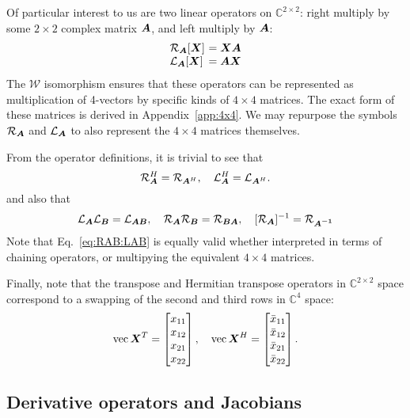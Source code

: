 \documentclass[useAMS,usenatbib]{mn2e}
\makeatletter
\newcommand{\COMPLEX}{\mathbb{C}}
\newcommand{\mat}[1]{{\bmath{#1}}}
\newcommand{\Matrix}[2]{\left [ \begin{array}{@{}#1@{}}#2\end{array} \right ]}
\newcommand{\Rop}[1]{\mathcal{R}_{{#1}}}
\newcommand{\Lop}[1]{\mathcal{L}_{{#1}}}
\numberwithin{equation}{section}
\makeatother
\begin{document}
Of particular interest to us are two linear operators on $\COMPLEX^{2\times2}$: right multiply by some $2\times2$ complex matrix $\mat{A}$, and left multiply by $\mat{A}$:
\begin{equation}
\begin{array}{l@{~}l}
\Rop{\mat{A}}[\mat{X}] &= \mat{XA} \\
\Lop{\mat{A}}[\mat{X}] &= \mat{AX} \\
\end{array}
\end{equation}
The $\mathcal{W}$ isomorphism ensures that these operators can be represented as multiplication of 4-vectors 
by specific kinds of $4\times4$ matrices. The exact form of these matrices is derived in Appendix~\ref{app:4x4}.
We may repurpose the symbols $\Rop{\mat{A}}$ and $\Lop{\mat{A}}$ to also represent the $4\times4$ matrices themselves. 

From the operator definitions, it is trivial to see that
\begin{equation}
\label{eq:RH:LH}
\Rop{\mat{A}}^H = \Rop{\mat{A}^H},~~~\Lop{\mat{A}}^H = \Lop{\mat{A}^H}.
\end{equation}
and also that
\begin{equation}
\label{eq:RAB:LAB}
\Lop{\mat{A}}\Lop{\mat{B}} = \Lop{\mat{AB}},~~~\Rop{\mat{A}}\Rop{\mat{B}} = \Rop{\mat{BA}},~~~[\Rop{\mat{A}}]^{-1} = \Rop{\mat{A^{-1}}}
\end{equation}
Note that Eq.~\ref{eq:RAB:LAB} is equally valid whether interpreted in terms of chaining operators, or multipying 
the equivalent $4\times4$ matrices.

Finally, note that the transpose and Hermitian transpose operators in $\COMPLEX^{2\times2}$ space correspond to a swapping
of the second and third rows in $\COMPLEX^4$ space:
\begin{equation}
\label{eq:vec:XH}
\VEC{\mat{X}^T} = \Matrix{c}{x_{11}\\x_{12}\\x_{21}\\x_{22}},~~~
\VEC{\mat{X}^H} = \Matrix{c}{\bar{x}_{11}\\\bar{x}_{12}\\\bar{x}_{21}\\\bar{x}_{22}}.
\end{equation}

\subsection{Derivative operators and Jacobians}
\end{document}
